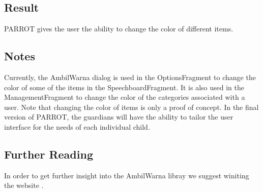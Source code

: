 \subsection*{Result}
PARROT gives the user the ability to change the color of different items.\newline

\subsection*{Notes}
Currently, the AmbilWarna dialog is used in the OptionsFragment %
to change the color of some of the items in the SpeechboardFragment. It is also used in the ManagementFragment to change the color of the categories associated with a user.\newline
Note that changing the color of items is only a proof of concept. In the final version of PARROT, the guardians will have the ability to tailor the user interface for the needs of each individual child.\newline

\subsection*{Further Reading}

In order to get further insight into the AmbilWarna libray we suggest winiting the website \cite{ambilw}.